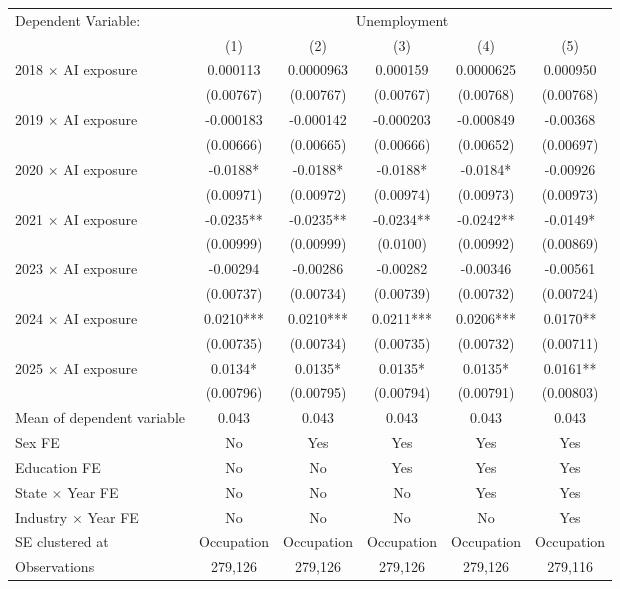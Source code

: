 \def\sym#1{\ifmmode^{#1}\else\(^{#1}\)\fi}
\begin{tabular}{l*{5}{c}}
\toprule
Dependent Variable: & \multicolumn{5}{c}{Unemployment} \\
\cmidrule(lr){2-6}
 & (1) & (2) & (3) & (4) & (5) \\
\midrule
2018 $\times$ AI exposure&    0.000113   &   0.0000963   &    0.000159   &   0.0000625   &    0.000950   \\
            &   (0.00767)   &   (0.00767)   &   (0.00767)   &   (0.00768)   &   (0.00768)   \\
2019 $\times$ AI exposure&   -0.000183   &   -0.000142   &   -0.000203   &   -0.000849   &    -0.00368   \\
            &   (0.00666)   &   (0.00665)   &   (0.00666)   &   (0.00652)   &   (0.00697)   \\
2020 $\times$ AI exposure&     -0.0188*  &     -0.0188*  &     -0.0188*  &     -0.0184*  &    -0.00926   \\
            &   (0.00971)   &   (0.00972)   &   (0.00974)   &   (0.00973)   &   (0.00973)   \\
2021 $\times$ AI exposure&     -0.0235** &     -0.0235** &     -0.0234** &     -0.0242** &     -0.0149*  \\
            &   (0.00999)   &   (0.00999)   &    (0.0100)   &   (0.00992)   &   (0.00869)   \\
2023 $\times$ AI exposure&    -0.00294   &    -0.00286   &    -0.00282   &    -0.00346   &    -0.00561   \\
            &   (0.00737)   &   (0.00734)   &   (0.00739)   &   (0.00732)   &   (0.00724)   \\
2024 $\times$ AI exposure&      0.0210***&      0.0210***&      0.0211***&      0.0206***&      0.0170** \\
            &   (0.00735)   &   (0.00734)   &   (0.00735)   &   (0.00732)   &   (0.00711)   \\
2025 $\times$ AI exposure&      0.0134*  &      0.0135*  &      0.0135*  &      0.0135*  &      0.0161** \\
            &   (0.00796)   &   (0.00795)   &   (0.00794)   &   (0.00791)   &   (0.00803)   \\
\midrule
Mean of dependent variable&       0.043   &       0.043   &       0.043   &       0.043   &       0.043   \\
Sex FE      &          No   &         Yes   &         Yes   &         Yes   &         Yes   \\
Education FE&          No   &          No   &         Yes   &         Yes   &         Yes   \\
State $\times$ Year FE&          No   &          No   &          No   &         Yes   &         Yes   \\
Industry $\times$ Year FE&          No   &          No   &          No   &          No   &         Yes   \\
SE clustered at&  Occupation   &  Occupation   &  Occupation   &  Occupation   &  Occupation   \\
Observations&     279,126   &     279,126   &     279,126   &     279,126   &     279,116   \\
\bottomrule
\end{tabular}
